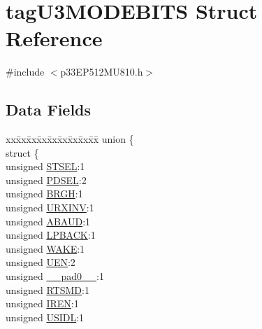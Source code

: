 \hypertarget{structtag_u3_m_o_d_e_b_i_t_s}{}\section{tag\+U3\+M\+O\+D\+E\+B\+I\+TS Struct Reference}
\label{structtag_u3_m_o_d_e_b_i_t_s}


{\ttfamily \#include $<$p33\+E\+P512\+M\+U810.\+h$>$}

\subsection*{Data Fields}
\begin{DoxyCompactItemize}
\item 
\begin{tabbing}
xx\=xx\=xx\=xx\=xx\=xx\=xx\=xx\=xx\=\kill
union \{\\
\>struct \{\\
\>\>unsigned \hyperlink{structtag_u3_m_o_d_e_b_i_t_s_a3d57376019f3ed30d788c5ad72938796}{STSEL}:1\\
\>\>unsigned \hyperlink{structtag_u3_m_o_d_e_b_i_t_s_acc0b2e4d43c615d3c033391b5c4a2d1b}{PDSEL}:2\\
\>\>unsigned \hyperlink{structtag_u3_m_o_d_e_b_i_t_s_a5ac4f749c73f2dfc0f8699b73fe251fc}{BRGH}:1\\
\>\>unsigned \hyperlink{structtag_u3_m_o_d_e_b_i_t_s_ab6387939f9a8bc487f0eab6e20afd53d}{URXINV}:1\\
\>\>unsigned \hyperlink{structtag_u3_m_o_d_e_b_i_t_s_aeb177356d5f30b6f3a28d8d65c4950f5}{ABAUD}:1\\
\>\>unsigned \hyperlink{structtag_u3_m_o_d_e_b_i_t_s_a138f7c04973519ef4dfe9bbc1610cbc0}{LPBACK}:1\\
\>\>unsigned \hyperlink{structtag_u3_m_o_d_e_b_i_t_s_a364c8b1b2c2f66b23dd1093ced3e20dd}{WAKE}:1\\
\>\>unsigned \hyperlink{structtag_u3_m_o_d_e_b_i_t_s_a2c884c6d86506e0a73df50998a97c1f9}{UEN}:2\\
\>\>unsigned \hyperlink{structtag_u3_m_o_d_e_b_i_t_s_adf71f3d8410c1f1dbbc96680a92c49af}{\_\_pad0\_\_}:1\\
\>\>unsigned \hyperlink{structtag_u3_m_o_d_e_b_i_t_s_a76bdbed23aeadbbf3d0d078bc48cc19f}{RTSMD}:1\\
\>\>unsigned \hyperlink{structtag_u3_m_o_d_e_b_i_t_s_a7e60ff69eada9f471fa59afdbaf29e93}{IREN}:1\\
\>\>unsigned \hyperlink{structtag_u3_m_o_d_e_b_i_t_s_a94d25c6c9271a4ab4f450319e34e2a00}{USIDL}:1\\

\end{tabbing}
\end{DoxyCompactItemize}
